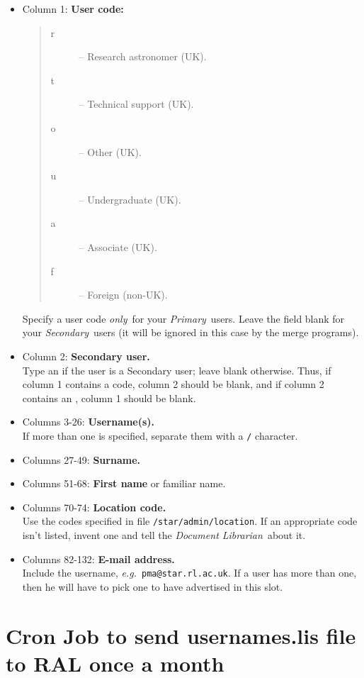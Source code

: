 \documentclass[twoside,11pt]{article}
\begin{document}
\begin{itemize}
\begin{itemize}
\item Column 1: {\bf User code:}
 \begin{quote}
 \begin{description}
  \item [r] -- Research astronomer (UK).
  \item [t] -- Technical support (UK).
  \item [o] -- Other (UK).
  \item [u] -- Undergraduate (UK).
  \item [a] -- Associate (UK).
  \item [f] -- Foreign (non-UK).
 \end{description}
 \end{quote}
 Specify a user code {\em only}\, for your {\em Primary}\, users.
 Leave the field blank for your {\em Secondary}\, users (it will be ignored
 in this case by the merge programs).
\item Column 2: {\bf Secondary user.}\\
 Type an {\tt *} if the user is a Secondary user; leave blank otherwise.
 Thus, if column 1 contains a code, column 2 should be blank, and if column 2
 contains an {\tt *}, column 1 should be blank.
\item Columns 3-26: {\bf Username(s).}\\
 If more than one is specified, separate them with a {\tt /} character.
\item Columns 27-49: {\bf Surname.}
\item Columns 51-68: {\bf First name} or familiar name.
\item Columns 70-74: {\bf Location code.}\\
 Use the codes specified in file {\tt /star/admin/location}.
 If an appropriate code isn't listed, invent one and tell the
 {\em Document Librarian}\, about it.
\item Columns 82-132: {\bf E-mail address.}\\
 Include the username, {\em e.g.}\ {\tt pma@star.rl.ac.uk}.
 If a user has more than one, then he will have to pick one to have
 advertised in this slot.
\end{itemize}
\end{itemize}

\newpage

\section{\label{cronjob}Cron Job to send usernames.lis file to RAL once a month}
\end{document}
